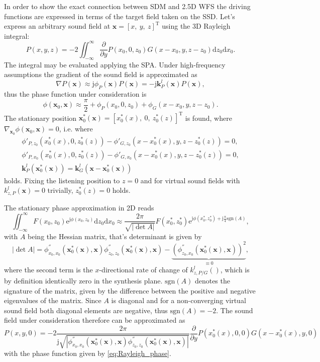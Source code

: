 \documentclass[12pt,a4paper]{article}
\newcommand{\td}{\mathrm{d}}
\newcommand{\te}{\mathrm{e}}
\newcommand{\ti}{\mathrm{j}}
\newcommand{\vx}{\mathbf{x}}
\newcommand{\vxo}{\mathbf{x}_0}
\newcommand{\vk}{\mathbf{k}}
\begin{document}
In order to show the exact connection between SDM and 2.5D WFS the driving functions are expressed in terms of the target field taken on the SSD.
Let's express an arbitrary sound field at $\vx = [x,\ y,\ z]^{\mathrm{T}}$ using the 3D Rayleigh integral:
\begin{equation}
P(x,y,z) = -2 \iint_{-\infty}^{\infty} \frac{\partial}{\partial y}P(x_0,0,z_0) G(x-x_0,y,z-z_0) \td z_0 \td x_0.
\end{equation}
The integral may be evaluated applying the SPA.
Under high-frequency assumptions the gradient of the sound field is approximated as
\begin{equation}
\nabla P(\vx) \approx \ti \phi_P(\vx) P(\vx) = -\ti \vk_P^l(\vx) P(\vx),
\end{equation}
thus the phase function under consideration is
\begin{equation}
\phi(\vxo,\vx) \approx \frac{\pi}{2} + \phi_P(x_0,0,z_0) + \phi_G(x-x_0,y,z-z_0).
\label{eq:Rayleigh_phase}
\end{equation}
The stationary position $\vxo^*(\vx) = [x_0^*(x),\ 0,\ z_0^*(z)]^{\mathrm{T}}$ is found, where $\nabla_{\vxo} \phi(\vxo,\vx) = 0$, i.e. where
\begin{align}
\phi'_{P,z_0}(x_0^*(x),0,z_0^*(z)) - \phi'_{G,z_0}(x- x_0^*(x),y,z-z_0^*(z)) = 0,\\
\phi'_{P,x_0}(x_0^*(x),0,z_0^*(z)) - \phi'_{G,x_0}(x- x_0^*(x),y,z-z_0^*(z)) = 0,\\
\vk^l_P(\vxo^*(\vx)) = \vk^l_G(\vx - \vxo^*(\vx))
\label{eq:rayleigh_stat_point}
\end{align}
holds. Fixing the listening position to $z=0$ and for virtual sound fields with $k^l_{z,P}(\vx) = 0$ trivially, $z_0^*(z) = 0$ holds.

The stationary phase approximation in 2D reads
\begin{equation}
\iint_{-\infty}^{\infty} F(x_0,z_0) \te^{\ti \phi(x_0,z_0)}\td z_0 \td x_0 \approx
\frac{2\pi}{\sqrt{|\det A|}}F(x_0^*,z_0^*) \te^{\ti \phi (x_0^*,z_0^*) + \ti \frac{\pi}{4} \text{sgn} (A)},
\end{equation}
with $A$ being the Hessian matrix, that's determinant is given by
\begin{equation}
|\det A| = \phi^{''}_{x_0,x_0}(\vxo^*(\vx),\vx) \phi^{''}_{z_0,z_0}(\vxo^*(\vx),\vx) - \underbrace{\left( \phi^{''}_{z_0,x_0}(\vxo^*(\vx),\vx) \right)^2}_{ \equiv 0},
\end{equation}
where the second term is the $x$-directional rate of change of $k^l_{z,P/G}()$, which is by definition identically zero in the synthesis plane. $\text{sgn}(A)$ denotes the signature of the matrix, given by the difference between the positive and negative eigenvalues of the matrix. Since $A$ is diagonal and for a non-converging virtual sound field both diagonal elements are negative, thus $\text{sgn} (A) = -2$.
The sound field under consideration therefore can be approximated as
\begin{equation}
P(x,y,0) =  -2 \frac{2\pi}{\ti \sqrt{|\phi^{''}_{x_0,x_0}(\vxo^*(\vx),\vx) \phi^{''}_{z_0,z_0}(\vxo^*(\vx),\vx)|}} \frac{\partial}{\partial y}P(x_0^*(x),0,0) G(x-x_0^*(x),y,0)
\end{equation}
with the phase function given by \eqref{eq:Rayleigh_phase}.
\end{document}
